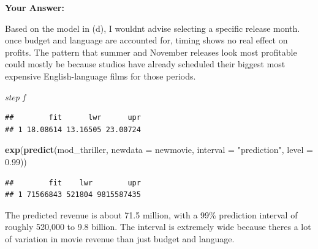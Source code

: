 \documentclass[
]{article}
\newenvironment{Shaded}{\begin{snugshade}}{\end{snugshade}}
\newcommand{\AttributeTok}[1]{\textcolor[rgb]{0.13,0.29,0.53}{#1}}
\newcommand{\DecValTok}[1]{\textcolor[rgb]{0.00,0.00,0.81}{#1}}
\newcommand{\FloatTok}[1]{\textcolor[rgb]{0.00,0.00,0.81}{#1}}
\newcommand{\FunctionTok}[1]{\textcolor[rgb]{0.13,0.29,0.53}{\textbf{#1}}}
\newcommand{\NormalTok}[1]{#1}
\newcommand{\OtherTok}[1]{\textcolor[rgb]{0.56,0.35,0.01}{#1}}
\newcommand{\SpecialCharTok}[1]{\textcolor[rgb]{0.81,0.36,0.00}{\textbf{#1}}}
\newcommand{\StringTok}[1]{\textcolor[rgb]{0.31,0.60,0.02}{#1}}
\begin{document}
\textbf{Your Answer:}

Based on the model in (d), I wouldnt advise selecting a specific release
month. once budget and language are accounted for, timing shows no real
effect on profits. The pattern that summer and November releases look
most profitable could mostly be because studios have already scheduled
their biggest most expensive English-language films for those periods.

\emph{step f}

\begin{Shaded}
\end{Shaded}

\begin{verbatim}
##        fit      lwr      upr
## 1 18.08614 13.16505 23.00724
\end{verbatim}

\begin{Shaded}
\begin{Highlighting}[]
\FunctionTok{exp}\NormalTok{(}\FunctionTok{predict}\NormalTok{(mod\_thriller, }\AttributeTok{newdata =}\NormalTok{ newmovie, }\AttributeTok{interval =} \StringTok{"prediction"}\NormalTok{, }\AttributeTok{level =} \FloatTok{0.99}\NormalTok{))}
\end{Highlighting}
\end{Shaded}

\begin{verbatim}
##        fit    lwr        upr
## 1 71566843 521804 9815587435
\end{verbatim}

The predicted revenue is about 71.5 million, with a 99\% prediction
interval of roughly 520,000 to 9.8 billion. The interval is extremely
wide because theres a lot of variation in movie revenue than just budget
and language.
\end{document}
